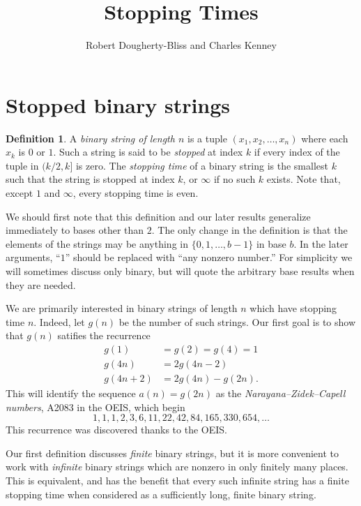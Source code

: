 \documentclass[12pt]{amsart}
\title{Stopping Times}
\author{Robert Dougherty-Bliss and Charles Kenney}
\theoremstyle{definition}
\newtheorem{definition}{Definition}
\begin{document}
\maketitle

\section{Stopped binary strings}%
\label{sec:stopped_binary_strings}

\begin{definition}
    A \emph{binary string of length $n$} is a tuple $(x_1, x_2, \dots, x_n)$
    where each $x_k$ is $0$ or $1$. Such a string is said to be \emph{stopped}
    at index $k$ if every index of the tuple in $(k / 2, k]$ is zero. The
    \emph{stopping time} of a binary string is the smallest $k$ such that the
    string is stopped at index $k$, or $\infty$ if no such $k$ exists. Note
    that, except $1$ and $\infty$, every stopping time is even.
\end{definition}

We should first note that this definition and our later results generalize
immediately to bases other than $2$. The only change in the definition is that
the elements of the strings may be anything in $\{0, 1, \dots, b - 1\}$ in base
$b$. In the later arguments, ``$1$'' should be replaced with ``any nonzero
number.''  For simplicity we will sometimes discuss only binary, but will quote
the arbitrary base results when they are needed.

We are primarily interested in binary strings of length $n$ which have stopping
time $n$. Indeed, let $g(n)$ be the number of such strings. Our first goal is
to show that $g(n)$ satifies the recurrence
\begin{align*}
    g(1) &= g(2) = g(4) = 1 \\
    g(4n) &= 2 g(4n - 2) \\
    g(4n + 2) &= 2 g(4n) - g(2n).
\end{align*}
This will identify the sequence $a(n) = g(2n)$ as the
\emph{Narayana--Zidek--Capell numbers}, A2083 in the OEIS, which begin
\begin{equation*}
    1, 1, 1, 2, 3, 6, 11, 22, 42, 84, 165, 330, 654, \dots
\end{equation*}
This recurrence was discovered thanks to the OEIS.

Our first definition discusses \emph{finite} binary strings, but it is more
convenient to work with \emph{infinite} binary strings which are nonzero in
only finitely many places. This is equivalent, and has the benefit that every
such infinite string has a finite stopping time when considered as a
sufficiently long, finite binary string.
\end{document}
